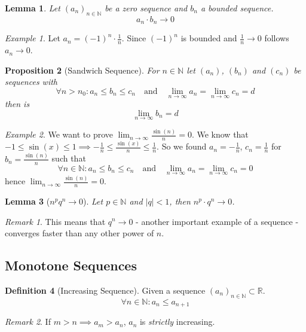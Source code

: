 \documentclass[english,titlepage]{uzhpub}
\theoremstyle{definition}
\newtheorem{definition}{Definition}[section]
\theoremstyle{plain}
\newtheorem{proposition}[definition]{Proposition}
\newtheorem{lemma}[definition]{Lemma}
\theoremstyle{remark}
\newtheorem*{remark}{Remark}
\theoremstyle{example}
\newtheorem*{example}{Example}
\begin{document}
   \begin{lemma}\label{lem:seq_converge_0}
      Let \((a_n)_{n \in \mathbb{N}}\) be a zero sequence and \(b_n\) a bounded sequence.
      \[a_n \cdot b_n \to 0\]
   \end{lemma}
   \begin{example}
      Let \(a_n = (-1)^n \cdot \frac{1}{n}\).
      Since \((-1)^n\) is bounded and \(\frac{1}{n} \to 0\) follows \(a_n \to 0\).
   \end{example}

   \begin{proposition}[Sandwich Sequence]\label{pro:sandwich_seq}
      For \(n \in \mathbb{N}\) let \((a_n)\), \((b_n)\) and \((c_n)\) be sequences with
      \[\forall n > n_0: a_n \leq b_n \leq c_n \quad\text{and}\quad \lim_{n \to \infty} a_n = \lim_{n \to \infty} c_n = d\]
      then is
      \[\lim_{n \to \infty} b_n = d\]
   \end{proposition}
   \begin{example}
      We want to prove \(\lim_{n \to \infty} \frac{\sin(n)}{n} = 0\).
      We know that \(-1 \leq \sin(x) \leq 1 \implies -\frac{1}{n} \leq \frac{\sin(x)}{n} \leq \frac{1}{n}\).
      So we found \(a_n = -\frac{1}{n}\), \(c_n = \frac{1}{n}\) for \(b_n = \frac{\sin(n)}{n}\) such that
      \[\forall n \in \mathbb{N}: a_n \leq b_n \leq c_n \quad\text{and}\quad \lim_{n \to \infty} a_n = \lim_{n \to \infty} c_n = 0\]
      hence \(\lim_{n \to \infty} \frac{\sin(n)}{n} = 0\).
   \end{example}

   \begin{lemma}[\(n^pq^n \to 0\)]\label{lem:exponent_converge_0}
      Let \(p \in \mathbb{N}\) and \(|q| < 1\), then \(n^p \cdot q^n \to 0\).
   \end{lemma}
   \begin{remark}
      This means that \(q^n \to 0\) - another important example of a sequence - converges faster than any other power of \(n\).
   \end{remark}

   \subsection{Monotone Sequences}
   \begin{definition}[Increasing Sequence]
      Given a sequence \((a_n)_{n \in \mathbb{N}} \subset \mathbb{R}\).
      \[\forall n \in \mathbb{N}: a_n \leq a_{n+1}\]
   \end{definition}
   \begin{remark}
      If \(m > n \implies a_m > a_n\), \(a_n\) is \textit{strictly} increasing.
   \end{remark}
\end{document}
